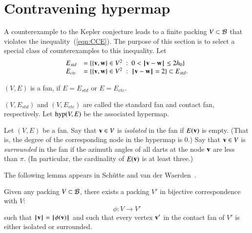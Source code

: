 \section{Contravening hypermap}

%
A counterexample to the Kepler conjecture leads to a finite packing $V\subset {\mathcal B}$ that violates the inequality~(\ref{eqn:CCE}).
 The purpose of this section is to select a special class of counterexamples to this inequality.
Let
\begin{equation}\label{eqn:fan-edge}
\begin{array}{lll}
 E_{std} &= \{\{{\mathbf v},{\mathbf w}\}\in V^2\ :\  0 < {\hskip0.1em|\hskip-0.15em|\hskip0.1em}{\mathbf v} - {\mathbf w}{\hskip0.1em|\hskip-0.15em|\hskip0.1em}\le 2{h_0} \}\\
 E_{ctc} &= \{\{{\mathbf v},{\mathbf w}\}\in V^2\ :\  {\hskip0.1em|\hskip-0.15em|\hskip0.1em}{\mathbf v} - {\mathbf w}{\hskip0.1em|\hskip-0.15em|\hskip0.1em}= 2 \}\subset E_{std}.
\end{array}
\end{equation}

\begin{lemma}
$(V,E)$ is a fan, if $E=E_{std}$ or $E=E_{ctc}$.
\end{lemma}
$(V,E_{std})$ and $(V,E_{ctc})$ are called the standard fan and contact fan, respectively.
Let ${\operatorname{hyp}}(V,E)$ be the associated hypermap.
%
%
%
%
%
%
%

\begin{definition}
Let $(V,E)$ be a fan.
Say that ${\mathbf v}\in V$ is {\it isolated} in the fan if $E({\mathbf v})$ is empty.
(That is, the degree of the corresponding node in the hypermap is $0$.) Say that ${\mathbf v}\in V$ is {\it surrounded} in the fan if the azimuth angles of all darts at the node ${\mathbf v}$ are less than $\pi$.  (In particular, the cardinality of $E({\mathbf v})$ is at least three.)
\end{definition}
%
%
%
%
%
%

The following lemma appears in Sch\"utte and van der Waerden~\cite{vanderWaerden:1951}.

\begin{lemma}
Given any packing $V\subset {\mathcal B}$,
there exists a  packing $V'$ 
in bijective correspondence with $V$:
$$
\phi:V\to V'
$$
such that ${{\hskip0.1em|\hskip-0.15em|\hskip0.1em}{\mathbf v}{\hskip0.1em|\hskip-0.15em|\hskip0.1em}} = {{\hskip0.1em|\hskip-0.15em|\hskip0.1em}\phi({\mathbf v}){\hskip0.1em|\hskip-0.15em|\hskip0.1em}}$ and
such that every vertex ${\mathbf v}'$ in the contact fan of $V'$
is either isolated or surrounded.
\end{lemma}
%
%
%


